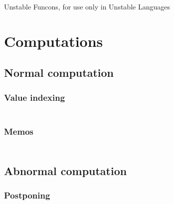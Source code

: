 Unstable Funcons, for use only in Unstable Languages

\section*{Computations}\hypertarget{computations}{}\label{computations}

\subsection*{Normal computation}\hypertarget{normal-computation}{}\label{normal-computation}

\subsubsection*{Value indexing}\hypertarget{value-indexing}{}\label{value-indexing}

\begin{align*}
  [ ~ 
  \KEY{Funcon} ~ & \NAMEHYPER{../../../../../Unstable-Funcons-beta/Computations/Normal}{Indexing}{allocate-index} \\
  \KEY{Funcon} ~ & \NAMEHYPER{../../../../../Unstable-Funcons-beta/Computations/Normal}{Indexing}{lookup-index}
  ~ ]
\end{align*}
\subsubsection*{Memos}\hypertarget{memos}{}\label{memos}

\begin{align*}
  [ ~ 
  \KEY{Funcon} ~ & \NAMEHYPER{../../../../../Unstable-Funcons-beta/Computations/Normal}{Memos}{initialise-memos} \\
  \KEY{Funcon} ~ & \NAMEHYPER{../../../../../Unstable-Funcons-beta/Computations/Normal}{Memos}{memo-value} \\
  \KEY{Funcon} ~ & \NAMEHYPER{../../../../../Unstable-Funcons-beta/Computations/Normal}{Memos}{memo-value-recall}
  ~ ]
\end{align*}
\subsection*{Abnormal computation}\hypertarget{abnormal-computation}{}\label{abnormal-computation}

\subsubsection*{Postponing}\hypertarget{postponing}{}\label{postponing}


